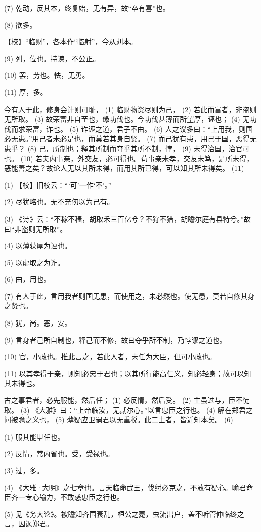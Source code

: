 \documentclass[12pt,UTF8]{ctexbook}
\begin{document}
(7) 乾动，反其本，终复始，无有异，故“卒有喜”也。

(8) 欲多。

【校】“临财”，各本作“临射”，今从刘本。

(9) 列，位也。持谏，不公正。

(10) 罢，劳也。怯，无勇。

(11) 厚，多。

今有人于此，修身会计则可耻， (1) 临财物资尽则为己， (2) 若此而富者，非盗则无所取。 (3) 故荣富非自至也，缘功伐也。今功伐甚薄而所望厚，诬也； (4) 无功伐而求荣富，诈也。 (5) 诈诬之道，君子不由。 (6) 人之议多曰：“上用我，则国必无患。”用己者未必是也，而莫若其身自贤。 (7) 而己犹有患，用己于国，恶得无患乎？ (8) 己，所制也；释其所制而夺乎其所不制，悖， (9) 未得治国，治官可也。 (10) 若夫内事亲，外交友，必可得也。苟事亲未孝，交友未笃，是所未得，恶能善之矣？故论人无以其所未得，而用其所已得，可以知其所未得矣。 (11)

(1) 【校】旧校云：“‘可’一作‘不’。”

(2) 尽犹略也。无不充仞以为己有。

(3) 《诗》云：“不稼不穑，胡取禾三百亿兮？不狩不猎，胡瞻尔庭有县特兮。”故曰“非盗则无所取”。

(4) 以薄获厚为诬也。

(5) 以虚取之为诈。

(6) 由，用也。

(7) 有人于此，言用我者则国无患，而使用之，未必然也。使无患，莫若自修其身之贤也。

(8) 犹，尚。恶，安。

(9) 言身者己所自制也，释己而不修，故曰夺乎所不制，乃悖谬之道也。

(10) 官，小政也。推此言之，若此人者，未任为大臣，但可小政也。

(11) 以其孝得于亲，则知必忠于君也；以其所行能高仁义，知必轻身；故可以知其未得也。

古之事君者，必先服能，然后任； (1) 必反情，然后受。 (2) 主虽过与，臣不徒取。 (3) 《大雅》曰：“上帝临汝，无贰尔心。”以言忠臣之行也。 (4) 解在郑君之问被瞻之义也， (5) 薄疑应卫嗣君以无重税。此二士者，皆近知本矣。 (6)

(1) 服其能堪任也。

(2) 反情，常内省也。受，受禄也。

(3) 过，多。

(4) 《大雅·大明》之七章也。言天临命武王，伐纣必克之，不敢有疑心。喻君命臣齐一专心输力，不敢惑忠臣之行也。

(5) 见《务大论》。被瞻知齐国衰乱，桓公之薨，虫流出户，盖不听管仲临终之言，因讽郑君。
\end{document}
